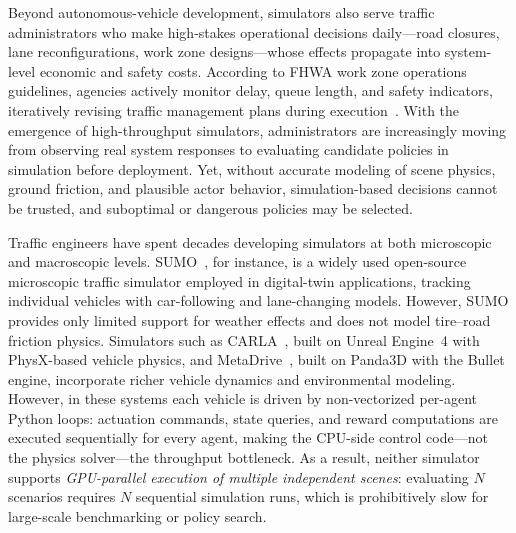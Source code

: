 
Beyond autonomous-vehicle development, simulators also serve traffic administrators who make high-stakes operational decisions daily—road closures, lane reconfigurations, work zone designs—whose effects propagate into system-level economic and safety costs.
According to FHWA work zone operations guidelines, agencies actively monitor delay, queue length, and safety indicators, iteratively revising traffic management plans during execution~\cite{fhwa_workzone_2023}.
With the emergence of high-throughput simulators, administrators are increasingly moving from observing real system responses to evaluating candidate policies in simulation before deployment.
Yet, without accurate modeling of scene physics, ground friction, and plausible actor behavior, simulation-based decisions cannot be trusted, and suboptimal or dangerous policies may be selected.


Traffic engineers have spent decades developing simulators at both microscopic and macroscopic levels.
SUMO~\cite{krajzewicz_sumo_2012}, for instance, is a widely used open-source microscopic traffic simulator employed in digital-twin applications, tracking individual vehicles with car-following and lane-changing models.
However, SUMO provides only limited support for weather effects and does not model tire--road friction physics.
Simulators such as CARLA~\cite{Dosovitskiy17}, built on Unreal Engine~4 with PhysX-based vehicle physics, and MetaDrive~\cite{li2022metadrive}, built on Panda3D with the Bullet engine, incorporate richer vehicle dynamics and environmental modeling.
However, in these systems each vehicle is driven by non-vectorized per-agent Python loops: actuation commands, state queries, and reward computations are executed sequentially for every agent, making the CPU-side control code---not the physics solver---the throughput bottleneck.
As a result, neither simulator supports \emph{GPU-parallel execution of multiple independent scenes}: evaluating $N$ scenarios requires $N$ sequential simulation runs, which is prohibitively slow for large-scale benchmarking or policy search.

